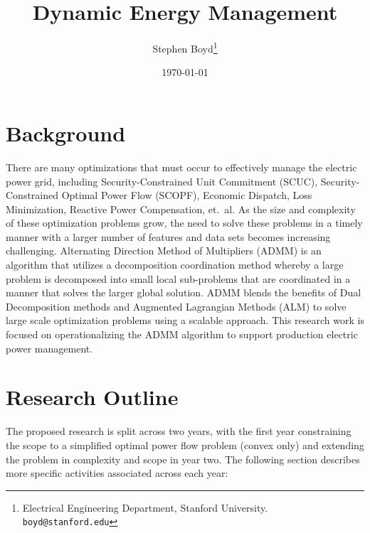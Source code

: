 \documentclass[12pt]{article}
\title{Dynamic Energy Management}
\author{
Stephen Boyd\thanks{
Electrical Engineering Department, Stanford University. 
\texttt{boyd@stanford.edu}}
}
\date{\today}
\begin{document}
\maketitle

\section{Background}

There are many optimizations that must occur
to effectively manage the electric power grid,
including Security-Constrained Unit Commitment (SCUC),
Security-Constrained Optimal Power Flow (SCOPF),
Economic Dispatch, Loss Minimization, Reactive Power Compensation, et.~al.
As the size and complexity of these optimization problems grow,
the need to solve these problems in a timely manner
with a larger number of features and data sets
becomes increasing challenging.
Alternating Direction Method of Multipliers (ADMM)
is an algorithm that utilizes a decomposition coordination method
whereby a large problem is decomposed into small local sub-problems
that are coordinated in a manner that solves the larger global solution.
ADMM blends the benefits of Dual Decomposition methods
and Augmented Lagrangian Methods (ALM)
to solve large scale optimization problems using a scalable approach.
This research work is focused on operationalizing the ADMM algorithm
to support production electric power management.

\section{Research Outline}
The proposed research is split across two years,
with the first year constraining the scope to a simplified
optimal power flow problem (convex only)
and extending the problem in complexity and scope in year two.
The following section describes more specific activities associated across each year:
\end{document}

